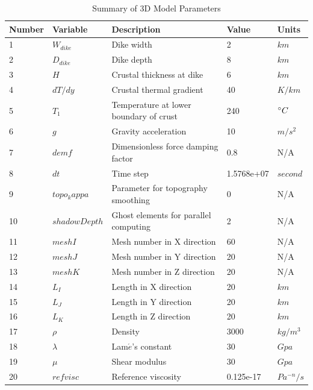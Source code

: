 \begin{table}[h]
\caption{Summary of 3D Model Parameters}
\centering
 \small
  \begin{tabular}[h]{l l p{6.8cm} l l}
\hline
\hline
Number & Variable & Description & Value & Units \\ 
\hline
1    &  $W_{dike}$    &   Dike width        & 2   &  $km$\\
\hline
2    &  $D_{dike}$    &   Dike depth        & 8   &  $km$\\
\hline
3    &  $H$    &   Crustal thickness at dike   & 6   &  $km$ \\
\hline
4    &  $dT/dy$    &   Crustal thermal gradient        & 40   &  $K/km$ \\
\hline
5    &  $T_{1}$    &   Temperature at lower boundary of crust    & 240   &  $\degree C$ \\
\hline
6    &  $g$    &   Gravity acceleration    & 10   &  $m/s^{2}$ \\
\hline
7    &  $demf$    &   Dimensionless force damping factor   & 0.8   &  N/A  \\
\hline
8    &  $dt$    &   Time step    & 1.5768e+07   &  $second$  \\
\hline
9    &  $topo_kappa$    &   Parameter for topography smoothing    & 0   &  N/A   \\
\hline
10   &  $shadowDepth$    &   Ghost elements for parallel computing   & 2   &  N/A   \\
\hline
11   &  $meshI$    &   Mesh number in X direction   & 60   &  N/A   \\
\hline
12   &  $meshJ$    &   Mesh number in Y direction      & 20   & N/A  \\
\hline
13   &  $meshK$    &   Mesh number in Z direction      & 20   & N/A  \\
\hline
14   &  $L_{I}$    &   Length in X direction      & 20   & $km$  \\
\hline
15   &  $L_{J}$    &   Length in Y direction      & 20   & $km$  \\
\hline
16   &  $L_{K}$    &   Length in Z direction      & 20   & $km$  \\
\hline
17   &  $\rho$    &    Density      & 3000   & $kg/m^{3}$  \\
\hline
18   &  $\lambda$    &    Lam$\acute{e}$'s constant      & 30   & $Gpa$  \\
\hline
19   &  $\mu$    &    Shear modulus      & 30   & $Gpa$  \\
\hline
20   &  $refvisc$    &    Reference viscosity      & 0.125e-17   & $Pa^{-n}/s$  \\

\end{tabular}
\end{table}

